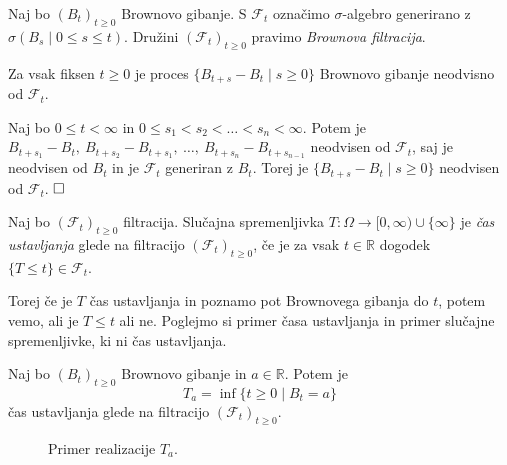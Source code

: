 \documentclass[twoside,11pt]{article}
\begin{document}
\begin{definicija}
    Naj bo $(B_t)_{t\geq 0}$ Brownovo gibanje. S $\mathcal{F}_t$ 
    označimo $\sigma$-algebro generirano z$ \sigma(B_s \mid 0\leq s \leq t)$. 
    Družini $(\mathcal{F}_t)_{t\geq 0}$ pravimo \textit{Brownova filtracija}.
\end{definicija}

\begin{izrek}
    Za vsak fiksen $t \geq 0$ je proces $\{B_{t+s}-B_t\mid s\geq 0\}$ Brownovo gibanje neodvisno 
    od $\mathcal{F}_t$.
\end{izrek}

\begin{dokaz}
    Naj bo $0 \leq t < \infty$ in $0 \leq s_1 < s_2 < \dots < s_n < \infty$. 
    Potem je $B_{t+s_1} - B_t, \ B_{t+s_2} - B_{t+s_1}, \ \dots, \ B_{t+s_n} - B_{t+s_{n-1}}$ 
    neodvisen od $\mathcal{F}_t$, saj je neodvisen od $B_t$ in je $\mathcal{F}_t$ generiran z 
    $B_t$. Torej je $\{B_{t+s}-B_t\mid s\geq 0\}$ neodvisen od $\mathcal{F}_t$.
    $\hfill \square$
\end{dokaz}

\begin{definicija}
    Naj bo $(\mathcal{F}_t)_{t\geq0}$ filtracija. Slučajna spremenljivka $T: \Omega \rightarrow [0, \infty)\cup \{\infty\}$ 
    je \textit{čas ustavljanja} glede na filtracijo $(\mathcal{F}_t)_{t\geq0}$, če je za vsak $t \in \mathbb{R}$ dogodek $\{T \leq t\} \in \mathcal{F}_t$.
\end{definicija}

Torej če je $T$ čas ustavljanja in poznamo pot Brownovega gibanja do $t$, potem vemo, 
ali je $T\leq t$ ali ne. Poglejmo si primer časa ustavljanja in primer slučajne spremenljivke, 
ki ni čas ustavljanja.

\begin{primer}
    Naj bo $(B_t)_{t\geq0}$ Brownovo gibanje in $a \in \mathbb{R}$. Potem je
    $$
        T_a = \inf\{t \geq 0 \mid B_t = a\}
    $$
    čas ustavljanja glede na filtracijo $(\mathcal{F}_t)_{t\geq0}$.
\end{primer}

\begin{figure}[h]
    \centering
    \caption{Primer realizacije $T_a$.}
    \label{fig:slika3}
\end{figure}
\end{document}
